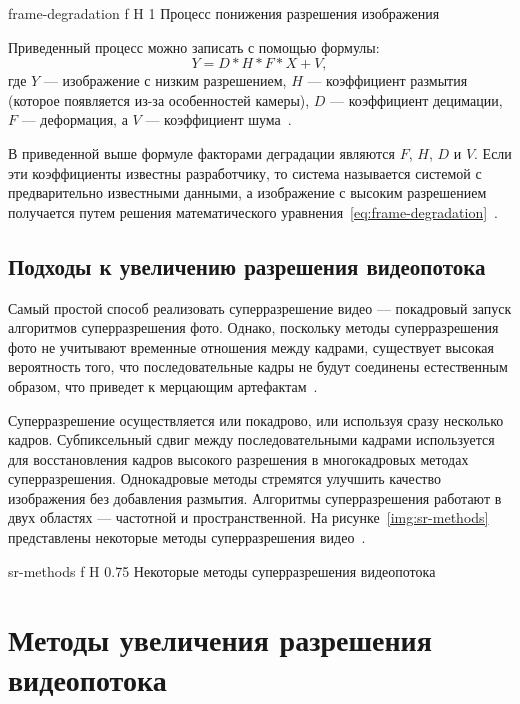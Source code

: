 \documentclass{bmstu}
\begin{document}
    {frame-degradation}
    {f}
    {H}
    {1\textwidth}
    {Процесс понижения разрешения изображения~\cite{Daithankar2021}}
    
Приведенный процесс можно записать с помощью формулы:
\begin{equation} 
\label{eq:frame-degradation}
Y = D * H * F * X + V,
\end{equation}
где $Y$ --- изображение с низким разрешением, $H$ --- коэффициент размытия (которое появляется из-за особенностей камеры), $D$ --- коэффициент децимации, $F$ --- деформация, а $V$ --- коэффициент шума~\cite{Daithankar2021}.

В приведенной выше формуле факторами деградации являются $F$, $H$, $D$ и $V$. 
Если эти коэффициенты известны разработчику, то система называется системой с предварительно известными данными, а изображение с высоким разрешением получается путем решения математического уравнения~\ref{eq:frame-degradation}~\cite{Daithankar2021}.

\section{Подходы к увеличению разрешения видеопотока}

Самый простой способ реализовать суперразрешение видео --- покадровый запуск алгоритмов суперразрешения фото. 
Однако, поскольку методы суперразрешения фото не учитывают временные отношения между кадрами, существует высокая вероятность того, что последовательные кадры не будут соединены естественным образом, что приведет к мерцающим артефактам~\cite{Younghyun2018}.

Суперразрешение осуществляется или покадрово, или используя сразу несколько кадров. 
Субпиксельный сдвиг между последовательными кадрами используется для восстановления кадров высокого разрешения в многокадровых методах суперразрешения. 
Однокадровые методы стремятся улучшить качество изображения без добавления размытия. 
Алгоритмы суперразрешения работают в двух областях --- частотной и пространственной. 
На рисунке~\ref{img:sr-methods} представлены некоторые методы суперразрешения видео~\cite{Daithankar2021}.

    {sr-methods}
    {f}
    {H}
    {0.75\textwidth}
    {Некоторые методы суперразрешения видеопотока~\cite{Daithankar2021}}

\chapter{Методы увеличения разрешения видеопотока}
\end{document}
